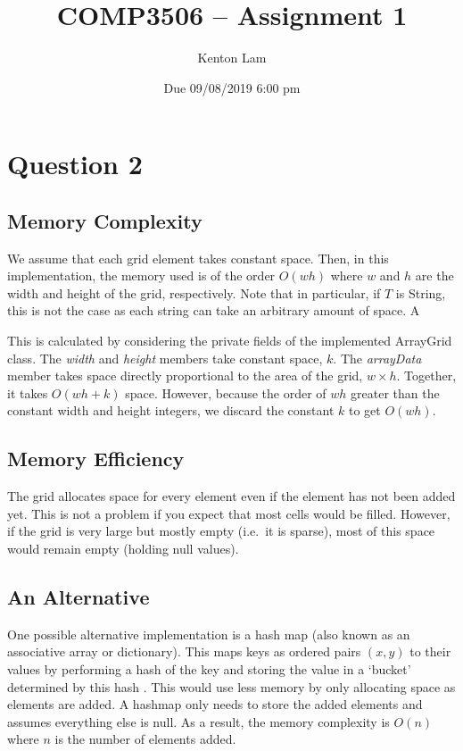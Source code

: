 \documentclass[11pt,a4paper]{article} %
\author{Kenton Lam}
\date{{Due 09/08/2019 6:00 pm}}
\title{COMP3506 -- Assignment 1}
\begin{document}
%

\setcounter{page}{1}
\maketitle
\section*{Question 2}
\subsection*{Memory Complexity}
We assume
that each grid element takes constant space. Then, 
in this implementation, the memory used is of the order 
$O(wh)$ where $w$ and 
$h$ are the width and height of the grid, respectively.
Note that 
in particular, if $T$ is String, this is not the case as each string 
can take an arbitrary amount of space. A

This is calculated by considering the private fields of the 
implemented ArrayGrid class. The \textit{width} and \textit{height}
members take constant space, $k$. The \textit{arrayData} member takes 
space directly proportional to the area of the grid, $w\times h$. 
Together, it takes $O(wh+k)$ space. However, because 
the order of $wh$ greater than the constant width and height integers, we 
discard the constant $k$ to get $O(wh)$.

\subsection*{Memory Efficiency}
The grid allocates space for every element even if the element has 
not been added yet. This is not a problem if you expect that most 
cells would be filled. However, if the grid is very large but 
mostly empty (i.e.\ it is sparse), most of this space would remain 
empty (holding null values).

\subsection*{An Alternative}
One possible alternative implementation is a hash map (also known as an associative array 
or dictionary). This maps keys
as ordered pairs $(x, y)$ to their values by performing a hash 
of the key and storing the value in a `bucket' determined by this hash \cite{clrs}. 
This would use less memory 
by only allocating space as elements are added. A hashmap only needs to store 
the added elements and assumes everything else is null. 
 As a result, the memory complexity is $O(n)$ where $n$ is the 
number of elements added. 
\end{document}
